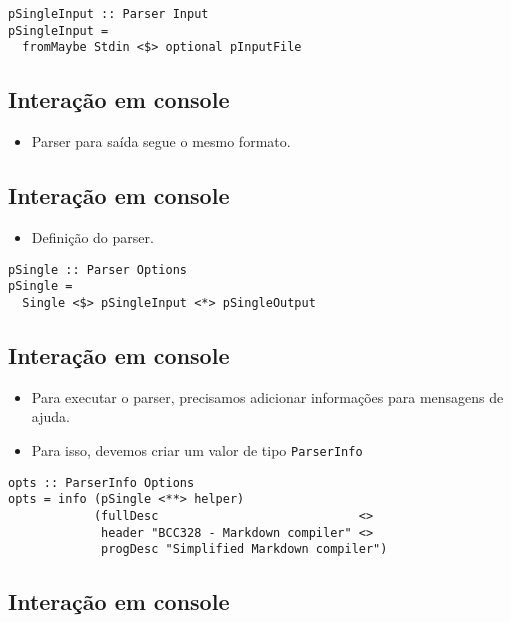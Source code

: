 \documentclass[11pt]{article}
\begin{document}
\begin{verbatim}
pSingleInput :: Parser Input
pSingleInput =
  fromMaybe Stdin <$> optional pInputFile
\end{verbatim}
\subsection*{Interação em console}
\label{sec:orgd042921}

\begin{itemize}
\item Parser para saída segue o mesmo formato.
\end{itemize}
\subsection*{Interação em console}
\label{sec:orgc79486b}

\begin{itemize}
\item Definição do parser.
\end{itemize}

\begin{verbatim}
pSingle :: Parser Options
pSingle =
  Single <$> pSingleInput <*> pSingleOutput
\end{verbatim}
\subsection*{Interação em console}
\label{sec:org378e48f}

\begin{itemize}
\item Para executar o parser, precisamos adicionar informações para mensagens de ajuda.

\item Para isso, devemos criar um valor de tipo \texttt{ParserInfo}
\end{itemize}

\begin{verbatim}
opts :: ParserInfo Options
opts = info (pSingle <**> helper)
            (fullDesc                            <>
             header "BCC328 - Markdown compiler" <>
             progDesc "Simplified Markdown compiler")
\end{verbatim}
\subsection*{Interação em console}
\label{sec:orgd4bdf2d}
\end{document}
